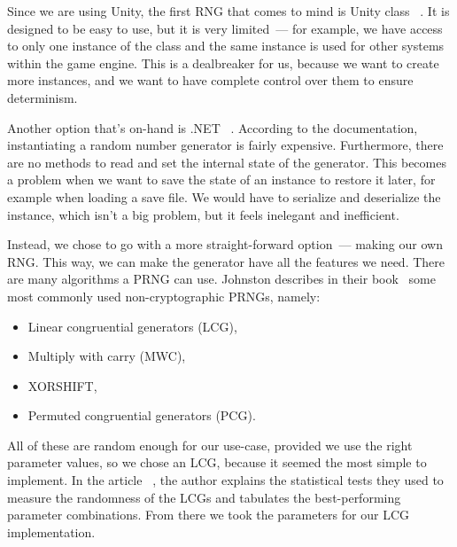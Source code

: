 Since we are using Unity, the first RNG that comes to mind is Unity class ~\cite{UnityRandom}.
It is designed to be easy to use, but it is very limited~--- for example, we have access to only one instance of the class and the same instance is used for other systems within the game engine.
This is a dealbreaker for us, because we want to create more instances, and we want to have complete control over them to ensure determinism.

Another option that's on-hand is .NET ~\cite{SystemRandom}.
According to the documentation, instantiating a random number generator is fairly expensive.
Furthermore, there are no methods to read and set the internal state of the generator.
This becomes a problem when we want to save the state of an instance to restore it later, for example when loading a save file.
We would have to serialize and deserialize the instance, which isn't a big problem, but it feels inelegant and inefficient.

Instead, we chose to go with a more straight-forward option~--- making our own RNG.
This way, we can make the generator have all the features we need.
There are many algorithms a PRNG can use.
Johnston describes in their book~\cite{johnston2018random} some most commonly used non-cryptographic PRNGs, namely:
\begin{itemize}
    \item Linear congruential generators (LCG),
    \item Multiply with carry (MWC),
    \item XORSHIFT,
    \item Permuted congruential generators (PCG).
\end{itemize}
All of these are random enough for our use-case, provided we use the right parameter values, so we chose an LCG, because it seemed the most simple to implement.
In the article ~\cite{LCGTables}, the author explains the statistical tests they used to measure the randomness of the LCGs and tabulates the best-performing parameter combinations.
From there we took the parameters for our LCG implementation.